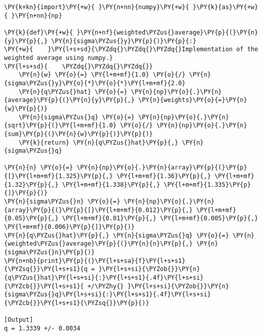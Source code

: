 \begin{Verbatim}[label=\makebox{\href{https://github.com/unipi-physics-labs/lab1-notes/tree/main/snippy/weighted_average.py}{https://github.com/.../weighted\_average.py}},commandchars=\\\{\}]
\PY{k+kn}{import}\PY{+w}{ }\PY{n+nn}{numpy}\PY{+w}{ }\PY{k}{as}\PY{+w}{ }\PY{n+nn}{np}

\PY{k}{def}\PY{+w}{ }\PY{n+nf}{weighted\PYZus{}average}\PY{p}{(}\PY{n}{y}\PY{p}{,} \PY{n}{sigma\PYZus{}y}\PY{p}{)}\PY{p}{:}
\PY{+w}{    }\PY{l+s+sd}{\PYZdq{}\PYZdq{}\PYZdq{}Implementation of the weighted average using numpy.}
\PY{l+s+sd}{    \PYZdq{}\PYZdq{}\PYZdq{}}
    \PY{n}{w} \PY{o}{=} \PY{l+m+mf}{1.0} \PY{o}{/} \PY{n}{sigma\PYZus{}y}\PY{o}{*}\PY{o}{*}\PY{l+m+mf}{2.0}
    \PY{n}{q\PYZus{}hat} \PY{o}{=} \PY{n}{np}\PY{o}{.}\PY{n}{average}\PY{p}{(}\PY{n}{y}\PY{p}{,} \PY{n}{weights}\PY{o}{=}\PY{n}{w}\PY{p}{)}
    \PY{n}{sigma\PYZus{}q} \PY{o}{=} \PY{n}{np}\PY{o}{.}\PY{n}{sqrt}\PY{p}{(}\PY{l+m+mf}{1.0} \PY{o}{/} \PY{n}{np}\PY{o}{.}\PY{n}{sum}\PY{p}{(}\PY{n}{w}\PY{p}{)}\PY{p}{)}
    \PY{k}{return} \PY{n}{q\PYZus{}hat}\PY{p}{,} \PY{n}{sigma\PYZus{}q}

\PY{n}{n} \PY{o}{=} \PY{n}{np}\PY{o}{.}\PY{n}{array}\PY{p}{(}\PY{p}{[}\PY{l+m+mf}{1.325}\PY{p}{,} \PY{l+m+mf}{1.36}\PY{p}{,} \PY{l+m+mf}{1.32}\PY{p}{,} \PY{l+m+mf}{1.338}\PY{p}{,} \PY{l+m+mf}{1.335}\PY{p}{]}\PY{p}{)}
\PY{n}{sigma\PYZus{}n} \PY{o}{=} \PY{n}{np}\PY{o}{.}\PY{n}{array}\PY{p}{(}\PY{p}{[}\PY{l+m+mf}{0.012}\PY{p}{,} \PY{l+m+mf}{0.05}\PY{p}{,} \PY{l+m+mf}{0.01}\PY{p}{,} \PY{l+m+mf}{0.005}\PY{p}{,} \PY{l+m+mf}{0.006}\PY{p}{]}\PY{p}{)}
\PY{n}{q\PYZus{}hat}\PY{p}{,} \PY{n}{sigma\PYZus{}q} \PY{o}{=} \PY{n}{weighted\PYZus{}average}\PY{p}{(}\PY{n}{n}\PY{p}{,} \PY{n}{sigma\PYZus{}n}\PY{p}{)}
\PY{n+nb}{print}\PY{p}{(}\PY{l+s+sa}{f}\PY{l+s+s1}{\PYZsq{}}\PY{l+s+s1}{q = }\PY{l+s+si}{\PYZob{}}\PY{n}{q\PYZus{}hat}\PY{l+s+si}{:}\PY{l+s+s1}{.4f}\PY{l+s+si}{\PYZcb{}}\PY{l+s+s1}{ +/\PYZhy{} }\PY{l+s+si}{\PYZob{}}\PY{n}{sigma\PYZus{}q}\PY{l+s+si}{:}\PY{l+s+s1}{.4f}\PY{l+s+si}{\PYZcb{}}\PY{l+s+s1}{\PYZsq{}}\PY{p}{)}

[Output]
q = 1.3339 +/- 0.0034
\end{Verbatim}
